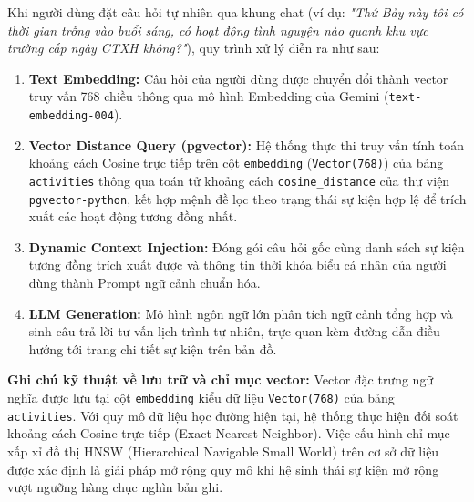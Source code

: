 Khi người dùng đặt câu hỏi tự nhiên qua khung chat (ví dụ: \textit{"Thứ Bảy này tôi có thời gian trống vào buổi sáng, có hoạt động tình nguyện nào quanh khu vực trường cấp ngày CTXH không?"}), quy trình xử lý diễn ra như sau:
\begin{enumerate}
    \item \textbf{Text Embedding:} Câu hỏi của người dùng được chuyển đổi thành vector truy vấn 768 chiều thông qua mô hình Embedding của Gemini (\texttt{text-embedding-004}).
    \item \textbf{Vector Distance Query (pgvector):} Hệ thống thực thi truy vấn tính toán khoảng cách Cosine trực tiếp trên cột \texttt{embedding} (\texttt{Vector(768)}) của bảng \texttt{activities} thông qua toán tử khoảng cách \texttt{cosine\_distance} của thư viện \texttt{pgvector-python}, kết hợp mệnh đề lọc theo trạng thái sự kiện hợp lệ để trích xuất các hoạt động tương đồng nhất.
    \item \textbf{Dynamic Context Injection:} Đóng gói câu hỏi gốc cùng danh sách sự kiện tương đồng trích xuất được và thông tin thời khóa biểu cá nhân của người dùng thành Prompt ngữ cảnh chuẩn hóa.
    \item \textbf{LLM Generation:} Mô hình ngôn ngữ lớn phân tích ngữ cảnh tổng hợp và sinh câu trả lời tư vấn lịch trình tự nhiên, trực quan kèm đường dẫn điều hướng tới trang chi tiết sự kiện trên bản đồ.
\end{enumerate}

\textbf{Ghi chú kỹ thuật về lưu trữ và chỉ mục vector:} Vector đặc trưng ngữ nghĩa được lưu tại cột \texttt{embedding} kiểu dữ liệu \texttt{Vector(768)} của bảng \texttt{activities}. Với quy mô dữ liệu học đường hiện tại, hệ thống thực hiện đối soát khoảng cách Cosine trực tiếp (Exact Nearest Neighbor). Việc cấu hình chỉ mục xấp xỉ đồ thị HNSW (Hierarchical Navigable Small World) trên cơ sở dữ liệu được xác định là giải pháp mở rộng quy mô khi hệ sinh thái sự kiện mở rộng vượt ngưỡng hàng chục nghìn bản ghi.
